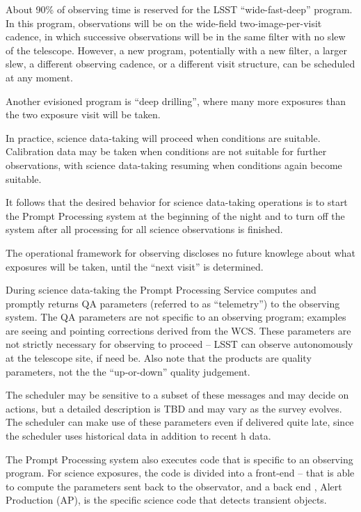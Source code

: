 About 90\% of observing time is reserved for the LSST “wide-fast-deep”
program. In this program, observations will be on the wide-field
two-image-per-visit cadence, in which successive observations will be
in the same filter with no slew of the telescope. However, a new
program, potentially with a new filter, a larger slew, a different
observing cadence, or a different visit structure, can be scheduled at
any moment.

Another evisioned program is ``deep drilling'', where many more exposures
than the two exposure visit will be taken.

In practice, science data-taking will proceed when conditions are
suitable. Calibration data may be taken when conditions are not
suitable for further observations, with science data-taking resuming
when conditions again become suitable.

It follows that the desired behavior for science data-taking
operations is to start the Prompt Processing system at the beginning
of the night and to turn off the system after all processing for all
science observations is finished.  

The operational framework for observing discloses no future knowlege
about what exposures will be taken, until the “next visit” is
determined.

During science data-taking the Prompt Processing Service computes and
promptly returns QA parameters (referred to as “telemetry”) to the
observing system. The QA parameters are not specific to an observing
program; examples are seeing and pointing corrections derived from the
WCS. These parameters are not strictly necessary for observing to
proceed -- LSST can observe autonomously at the telescope site, if
need be. Also note that the products are quality parameters, not the
the “up-or-down” quality judgement.

The scheduler may be sensitive to a subset of these messages and may
decide on actions, but a detailed description is TBD and may vary as
the survey evolves. The scheduler can make use of these parameters even
if delivered quite late, since the scheduler uses historical data
in addition to recent h data.

The Prompt Processing system also executes code that is specific to an
observing program. For science exposures, the code is divided into
a front-end -- that is able to compute the parameters sent back  to the
observator, and a back end , Alert Production (AP), is the specific
science code that detects transient objects.

